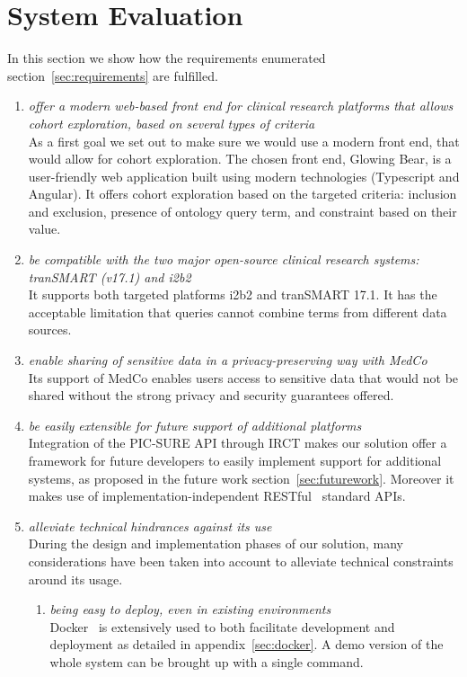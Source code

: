 \chapter{System Evaluation}
\label{sec:evaluation}

In this section we show how the requirements enumerated section~\ref{sec:requirements} are fulfilled.

\begin{enumerate}
    \item \emph{offer a modern web-based front end for clinical research platforms that allows cohort exploration, based on several types of criteria} \\
    As a first goal we set out to make sure we would use a modern front end, that would allow for cohort exploration. The chosen front end, Glowing Bear, is a user-friendly web application built using modern technologies (Typescript and Angular).
    It offers cohort exploration based on the targeted criteria: inclusion and exclusion, presence of ontology query term, and constraint based on their value.
    
    \item \emph{be compatible with the two major open-source clinical research systems: tranSMART (v17.1) and i2b2} \\
    It supports both targeted platforms i2b2 and tranSMART 17.1.
    It has the acceptable limitation that queries cannot combine terms from different data sources.

    \item \emph{enable sharing of sensitive data in a privacy-preserving way with MedCo} \\
    Its support of MedCo enables users access to sensitive data that would not be shared without the strong privacy and security guarantees offered.

    \item \emph{be easily extensible for future support of additional platforms} \\
    Integration of the PIC-SURE API through IRCT makes our solution offer a framework for future developers to easily implement support for additional systems, as proposed in the future work section~\ref{sec:futurework}.
    Moreover it makes use of implementation-independent RESTful~\cite{rest} standard APIs.

    \item \emph{alleviate technical hindrances against its use} \\
    During the design and implementation phases of our solution, many considerations have been taken into account to alleviate technical constraints around its usage.
    \begin{enumerate}
        \item \emph{being easy to deploy, even in existing environments} \\
        Docker~\cite{merkel2014docker} is extensively used to both facilitate development and deployment as detailed in appendix~\ref{sec:docker}.
        A demo version of the whole system can be brought up with a single command.
        

\end{enumerate}
\end{enumerate}
